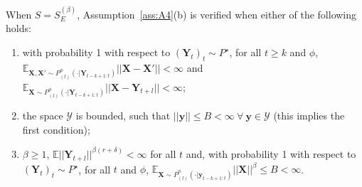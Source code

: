 \documentclass[twoside,11pt]{article}
\newcommand{\E}{\mathbb{E}}
\newcommand{\ddobs}{\mathbf{y}}
\newcommand{\Ddsim}{\mathbf{X}}
\newcommand{\Ddobs}{\mathbf{Y}}
\begin{document}
	\begin{lemma}\label{lemma:bounded_energy}
		When $ S = S_E^{(\beta)} $, Assumption~\ref{ass:A4}(b) is verified  when either of the following holds: 
		\begin{enumerate}
			\item with probability 1 with respect to $ (\Ddobs_t)_t\sim P^\star $, for all $ t \ge k$ and $ \phi $,\\ $ \E_{\Ddsim,\Ddsim'\sim P^\phi_{(l)}(\cdot|\Ddobs_{t-k+1:t})}||\Ddsim-\Ddsim'||<\infty  $ and $ \E_{\Ddsim\sim P^\phi_{(l)}(\cdot|\Ddobs_{t-k+1:t})}||\Ddsim-\Ddobs_{t+l}||<\infty $;
			\item the space $ \mathcal{Y} $ is bounded, such that $ ||\ddobs|| \le B<\infty \ \forall \ \ddobs\in\mathcal{Y}$ (this implies the first condition);
			\item $\beta\ge1$, $ \E ||\Ddobs_{t+l}||^{\beta(r+\delta)} <\infty $ for all $ t $ and, with probability 1 with respect to $ (\Ddobs_t)_t\sim P^\star $, for all $ t $ and $ \phi $, $  \E_{\Ddsim\sim P^\phi_{(l)}(\cdot|\ddobs_{t-k+1:t})}||\Ddsim||^\beta \le B<\infty$.
		\end{enumerate}	
		
	\end{lemma}
	
\end{document}
